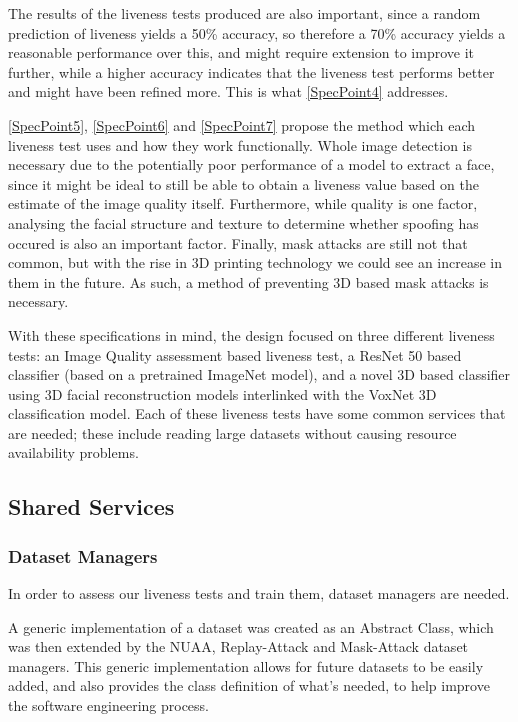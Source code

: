 \documentclass[10pt,a4paper]{article}
\begin{document}
        The results of the liveness tests produced are also important, since a random prediction of liveness yields a 50\% accuracy, so therefore a 70\% accuracy yields a reasonable performance over this, and might require extension to improve it further,
        while a higher accuracy indicates that the liveness test performs better and might have been refined more. This is what \ref{SpecPoint4} addresses.

        \ref{SpecPoint5}, \ref{SpecPoint6} and \ref{SpecPoint7} propose the method which each liveness test uses and how they work functionally. Whole image detection is necessary due to the potentially poor performance of a model to extract a face,
        since it might be ideal to still be able to obtain a liveness value based on the estimate of the image quality itself. Furthermore, while quality is one factor, analysing the facial structure and texture to determine whether spoofing has occured
        is also an important factor. Finally, mask attacks are still not that common, but with the rise in 3D printing technology we could see an increase in them in the future. As such, a method of preventing 3D based mask attacks is necessary.


        With these specifications in mind, the design focused on three different liveness tests: an Image Quality assessment based liveness test, a ResNet 50 based classifier (based on a pretrained ImageNet model),
        and a novel 3D based classifier using 3D facial reconstruction models interlinked with the VoxNet 3D classification model. Each of these liveness tests have some common services that are needed; these include
        reading large datasets without causing resource availability problems.


    \subsection{Shared Services}
        \subsubsection{Dataset Managers}
        In order to assess our liveness tests and train them, dataset managers are needed.

        A generic implementation of a dataset was created as an Abstract Class, which was then extended by the NUAA, Replay-Attack and Mask-Attack dataset managers.
        This generic implementation allows for future datasets to be easily added, and also provides the class definition of what's needed, to help improve the software engineering process.
\end{document}
